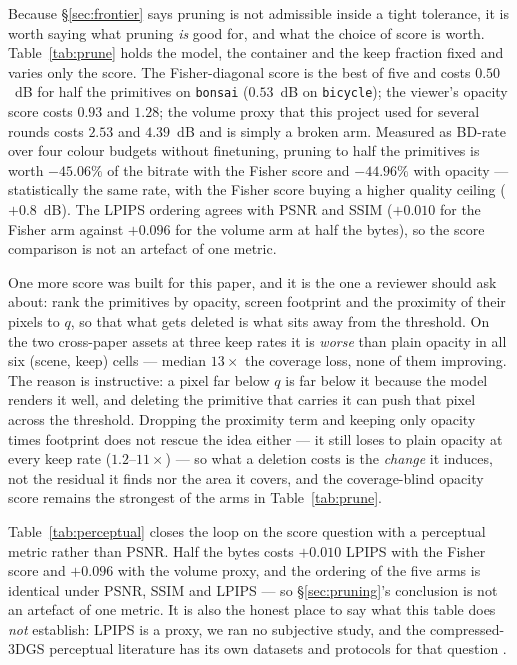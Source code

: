\documentclass[preprint,number,3p]{elsarticle}
\begin{document}
Because \S\ref{sec:frontier} says pruning is not admissible inside a tight tolerance, it is worth saying what pruning
\emph{is} good for, and what the choice of score is worth. Table~\ref{tab:prune} holds the model, the container and the
keep fraction fixed and varies only the score. The Fisher-diagonal score \cite{pup3dgs} is the best of five and costs
$0.50$~dB for half the primitives on \texttt{bonsai} ($0.53$~dB on \texttt{bicycle}); the viewer's opacity score costs
$0.93$ and $1.28$; the volume proxy that this project used for several rounds costs $2.53$ and $4.39$~dB and is simply
a broken arm. Measured as BD-rate over four colour budgets without finetuning, pruning to half the primitives is worth
$-45.06\%$ of the bitrate with the Fisher score and $-44.96\%$ with opacity --- statistically the same rate, with the
Fisher score buying a higher quality ceiling ($+0.8$~dB). The LPIPS ordering agrees with PSNR and SSIM ($+0.010$ for
the Fisher arm against $+0.096$ for the volume arm at half the bytes), so the score comparison is not an artefact of
one metric.

One more score was built for this paper, and it is the one a reviewer should ask about: rank the primitives by
opacity, screen footprint and the proximity of their pixels to $q$, so that what gets deleted is what sits
away from the threshold. On the two cross-paper assets at three keep rates it is \emph{worse} than plain
opacity in all six (scene, keep) cells --- median $13\times$ the coverage loss, none of them improving. The
reason is instructive: a pixel far below $q$ is far below it because the model renders it well, and deleting
the primitive that carries it can push that pixel across the threshold. Dropping the proximity term and keeping
only opacity times footprint does not rescue the idea either --- it still loses to plain opacity at every keep
rate ($1.2$--$11\times$) --- so what a deletion costs is the \emph{change} it induces, not the residual it
finds nor the area it covers, and the coverage-blind opacity score remains the strongest of the arms in
Table~\ref{tab:prune}.



Table~\ref{tab:perceptual} closes the loop on the score question with a perceptual metric rather than PSNR. Half the
bytes costs $+0.010$ LPIPS with the Fisher score and $+0.096$ with the volume proxy, and the ordering of the five arms
is identical under PSNR, SSIM and LPIPS --- so \S\ref{sec:pruning}'s conclusion is not an artefact of one metric. It is
also the honest place to say what this table does \emph{not} establish: LPIPS is a proxy, we ran no subjective study,
and the compressed-3DGS perceptual literature has its own datasets and protocols for that question
\cite{gscompqa,gsbench}.
\end{document}
